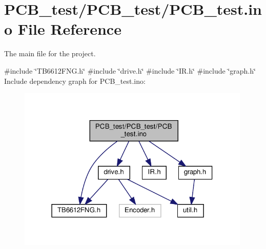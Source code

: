 \hypertarget{PCB__test_8ino}{}\section{P\+C\+B\+\_\+test/\+P\+C\+B\+\_\+test/\+P\+C\+B\+\_\+test.ino File Reference}
\label{PCB__test_8ino}


The main file for the project.  


{\ttfamily \#include \char`\"{}T\+B6612\+F\+N\+G.\+h\char`\"{}}\newline
{\ttfamily \#include \char`\"{}drive.\+h\char`\"{}}\newline
{\ttfamily \#include \char`\"{}I\+R.\+h\char`\"{}}\newline
{\ttfamily \#include \char`\"{}graph.\+h\char`\"{}}\newline
Include dependency graph for P\+C\+B\+\_\+test.\+ino\+:
\nopagebreak
\begin{figure}[H]
\begin{center}
\leavevmode
\includegraphics[width=315pt]{PCB__test_8ino__incl}
\end{center}
\end{figure}
